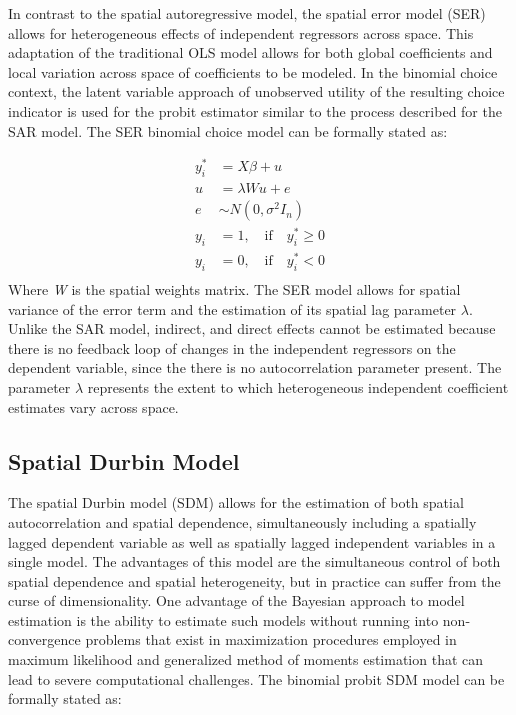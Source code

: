 In contrast to the spatial autoregressive model, the spatial error model (SER) allows for heterogeneous effects of independent regressors across space.  This adaptation of the traditional OLS model allows for both global coefficients and local variation across space of coefficients to be modeled.  In the binomial choice context, the latent variable approach of unobserved utility of the resulting choice indicator is used for the probit estimator similar to the process described for the SAR model.  The SER binomial choice model can be formally stated as:

\begin{equation}
\begin{split}
y^{*}_{i} &= X\beta + u \\
u &= \lambda Wu + e \\
e &\sim N(0, \sigma^{2}I_n) \\
y_i &= 1,\quad \text{if} \quad y^{*}_{i} \geq 0\\
y_i &= 0,\quad  \text{if} \quad  y^{*}_{i} < 0  \\
\end{split}
\end{equation}%
%
Where \textit{W} is the spatial weights matrix.  The SER model allows for spatial variance of the error term and the estimation of its spatial lag parameter $\lambda$.  Unlike the SAR model, indirect, and direct effects cannot be estimated because there is no feedback loop of changes in the independent regressors on the dependent variable, since the there is no autocorrelation parameter present.  The parameter $\lambda$ represents the extent to which heterogeneous independent coefficient estimates vary across space.

\subsection{Spatial Durbin Model}   

The spatial Durbin model (SDM) allows for the estimation of both spatial autocorrelation and spatial dependence, simultaneously including a spatially lagged dependent variable as well as spatially lagged independent variables in a single model.  The advantages of this model are the simultaneous control of both spatial dependence and spatial heterogeneity, but in practice can suffer from the curse of dimensionality.  One advantage of the Bayesian approach to model estimation is the ability to estimate such models without running into non-convergence problems that exist in maximization procedures employed in maximum likelihood and generalized method of moments estimation that can lead to severe computational challenges.  The binomial probit SDM model can be formally stated as:

